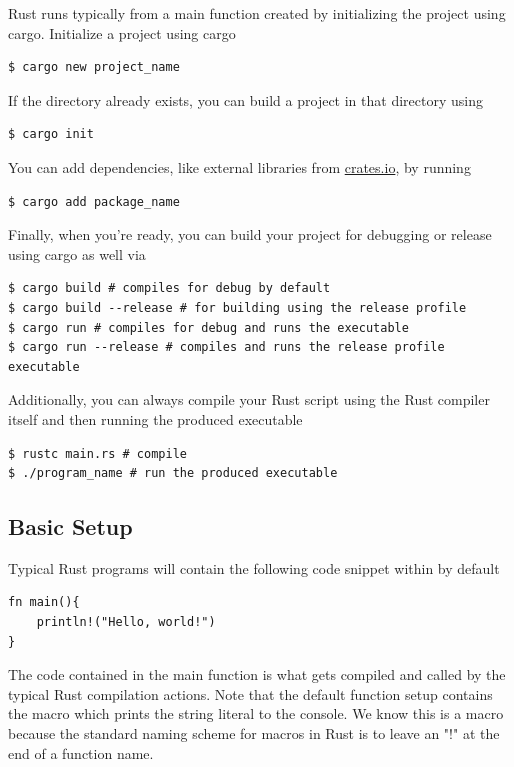\documentclass[]{article}
\begin{document}
Rust runs typically from a main function created by initializing the project using cargo.
Initialize a project using cargo 
\begin{verbatim}
$ cargo new project_name
\end{verbatim}
If the directory already exists, you can build a project in that directory using
\begin{verbatim}
$ cargo init
\end{verbatim}
You can add dependencies, like external libraries from \href{crates.io}{crates.io}, by running
\begin{verbatim}
$ cargo add package_name
\end{verbatim}
Finally, when you're ready, you can build your project for debugging or release using cargo as well via
\begin{verbatim}
$ cargo build # compiles for debug by default
$ cargo build --release # for building using the release profile
$ cargo run # compiles for debug and runs the executable
$ cargo run --release # compiles and runs the release profile executable
\end{verbatim}
Additionally, you can always compile your Rust script using the Rust compiler itself and then running the produced executable
\begin{verbatim}
$ rustc main.rs # compile
$ ./program_name # run the produced executable
\end{verbatim}
\subsection{Basic Setup}

Typical Rust programs will contain the following code snippet within  by default
\begin{verbatim}
fn main(){
    println!("Hello, world!")
}
\end{verbatim}
The code contained in the main function is what gets compiled and called by the typical Rust compilation actions.
Note that the default function setup contains the macro  which prints the string literal  to the console.
We know this is a macro because the standard naming scheme for macros in Rust is to leave an "!" at the end of a function name.
\end{document}
